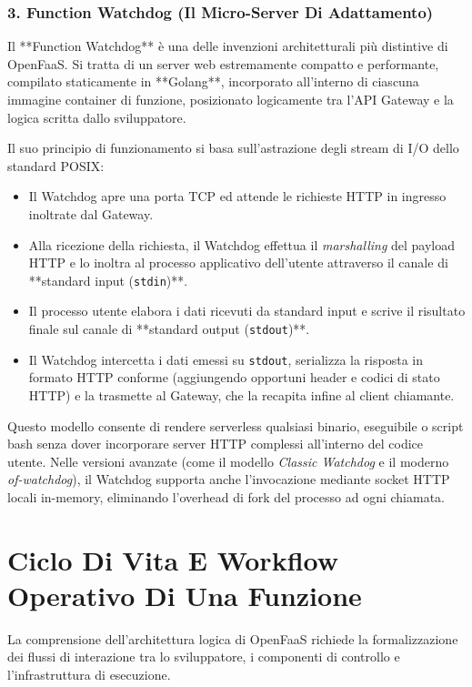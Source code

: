 \documentclass[11pt, a4paper]{article}
\begin{document}
\subsubsection{3. Function Watchdog (Il Micro-Server Di Adattamento)}
Il **Function Watchdog** è una delle invenzioni architetturali più distintive di OpenFaaS. Si tratta di un server web estremamente compatto e performante, compilato staticamente in **Golang**, incorporato all'interno di ciascuna immagine container di funzione, posizionato logicamente tra l'API Gateway e la logica scritta dallo sviluppatore.

Il suo principio di funzionamento si basa sull'astrazione degli stream di I/O dello standard POSIX:
\begin{itemize}[noitemsep]
    \item Il Watchdog apre una porta TCP ed attende le richieste HTTP in ingresso inoltrate dal Gateway.
    \item Alla ricezione della richiesta, il Watchdog effettua il \emph{marshalling} del payload HTTP e lo inoltra al processo applicativo dell'utente attraverso il canale di **standard input (\texttt{stdin})**.
    \item Il processo utente elabora i dati ricevuti da standard input e scrive il risultato finale sul canale di **standard output (\texttt{stdout})**.
    \item Il Watchdog intercetta i dati emessi su \texttt{stdout}, serializza la risposta in formato HTTP conforme (aggiungendo opportuni header e codici di stato HTTP) e la trasmette al Gateway, che la recapita infine al client chiamante.
\end{itemize}
Questo modello consente di rendere serverless qualsiasi binario, eseguibile o script bash senza dover incorporare server HTTP complessi all'interno del codice utente. Nelle versioni avanzate (come il modello \emph{Classic Watchdog} e il moderno \emph{of-watchdog}), il Watchdog supporta anche l'invocazione mediante socket HTTP locali in-memory, eliminando l'overhead di fork del processo ad ogni chiamata.

\newpage

\section{Ciclo Di Vita E Workflow Operativo Di Una Funzione}

La comprensione dell'architettura logica di OpenFaaS richiede la formalizzazione dei flussi di interazione tra lo sviluppatore, i componenti di controllo e l'infrastruttura di esecuzione.
\end{document}
